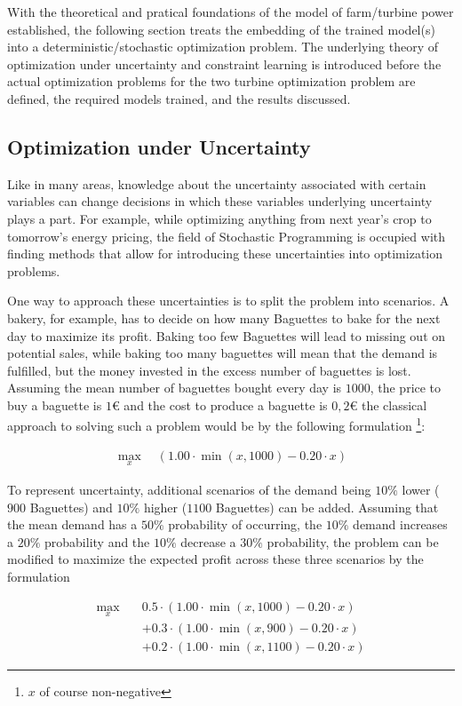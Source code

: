 \documentclass[preprint,12pt]{elsarticle}
\begin{document}
With the theoretical and pratical foundations of the model of farm/turbine power established, the following section treats the embedding of the trained model(s)  into a deterministic/stochastic optimization problem. The underlying theory of optimization under uncertainty and constraint learning is introduced before the actual optimization problems for the two turbine optimization problem are defined, the required models trained, and the results discussed.


\subsection{Optimization under Uncertainty}

Like in many areas, knowledge about the uncertainty associated with certain variables can change decisions in which these variables underlying uncertainty plays a part. For example, while optimizing anything from next year's crop to tomorrow's energy pricing, the field of Stochastic Programming is occupied with finding methods that allow for introducing these uncertainties into optimization problems.

One way to approach these uncertainties is to split the problem into scenarios. A bakery, for example, has to decide on how many Baguettes to bake for the next day to maximize its profit. Baking too few Baguettes will lead to missing out on potential sales, while baking too many baguettes will mean that the demand is fulfilled, but the money invested in the excess number of baguettes is lost. Assuming the mean number of baguettes bought every day is $1000$, the price to buy a baguette is $1 €$ and the cost to produce a baguette is $0,2 €$ the classical approach to solving such a problem would be by the following formulation \footnote{$x$ of course non-negative}: 


\begin{align*}
	\max_{x} \quad \left( 1.00 \cdot \min(x,1000) - 0.20 \cdot x \right)
\end{align*}


To represent uncertainty, additional scenarios of the demand being $10\%$ lower ($900$ Baguettes) and $10\%$ higher ($1100$ Baguettes) can be added. Assuming that the mean demand has a $50\%$ probability of occurring, the $10\%$ demand increases a $20\%$ probability and the $10\%$ decrease a $30\%$  probability, the problem can be modified to maximize the expected profit across these three scenarios by the formulation

\begin{align*}
	\max_{x} \quad & 0.5 \cdot \left(1.00 \cdot \min(x,1000) - 0.20 \cdot x \right) \\
	&+ 0.3 \cdot \left(1.00 \cdot \min(x,900) - 0.20 \cdot x\right) \\
	&+ 0.2 \cdot \left(1.00 \cdot \min(x,1100) - 0.20 \cdot x\right)
\end{align*}
\end{document}
